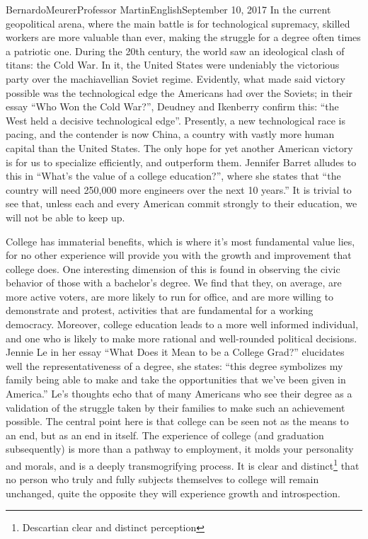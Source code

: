 \documentclass[12pt,letterpaper]{article}
\begin{document}
\begin{mla}{Bernardo}{Meurer}{Professor Martin}{English}{September 10, 2017}
    In the current geopolitical arena, where the main battle is for 
    technological supremacy, skilled workers are more valuable than ever, 
    making the struggle for a degree often times a patriotic one. During the 
    20th century, the world saw an ideological clash of titans: the Cold War. 
    In it, the United States were undeniably the victorious party over the 
    machiavellian Soviet regime. Evidently, what made said victory possible was 
    the technological edge the Americans had over the Soviets; in their essay 
    ``Who Won the Cold War?'', Deudney and Ikenberry confirm this: ``the West 
    held a decisive technological edge''. Presently, a new technological race 
    is pacing, and the contender is now China, a country with vastly more human 
    capital than the United States. The only hope for yet another American 
    victory is for us to specialize efficiently, and outperform them. Jennifer 
    Barret alludes to this in ``What's the value of a college education?'', 
    where she states that ``the country will need 250,000 more engineers over 
    the next 10 years.'' It is trivial to see that, unless each and every 
    American commit strongly to their education, we will not be able to keep 
    up. 

    College has immaterial benefits, which is where it's most fundamental value 
    lies, for no other experience will provide you with the growth and 
    improvement that college does. One interesting dimension of this is found 
    in observing the civic behavior of those with a bachelor's degree. We find 
    that they, on average, are more active voters, are more likely to run for 
    office, and are more willing to demonstrate and protest, activities that 
    are fundamental for a working democracy. Moreover, college education leads 
    to a more well informed individual, and one who is likely to make more 
    rational and well-rounded political decisions. Jennie Le in her essay 
    ``What Does it Mean to be a College Grad?'' elucidates well the 
    representativeness of a degree, she states: ``this degree symbolizes my 
    family being able to make and take the opportunities that we've been given 
    in America.'' Le's thoughts echo that of many Americans who see their 
    degree as a validation of the struggle taken by their families to make such 
    an achievement possible. The central point here is that college can be seen 
    not as the means to an end, but as an end in itself. The experience of 
    college (and graduation subsequently) is more than a pathway to employment,
    it molds your personality and morals, and is a deeply transmogrifying 
    process. It is clear and distinct\footnote{Descartian clear and distinct 
    perception} that no person who truly and fully subjects themselves to college will remain unchanged, quite the opposite they will experience growth and introspection.


\end{mla}
\end{document}
